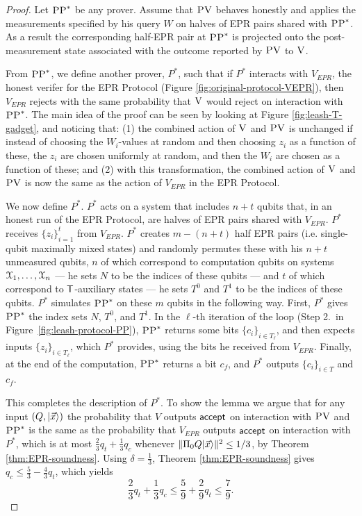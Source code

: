\begin{proof}
Let $\textsc{PP}^*$ be any prover. Assume that $\textsc{PV}$ behaves honestly and applies the measurements specified by his query $W$ on halves of EPR pairs shared with $\textsc{PP}^*$. As a result the corresponding half-EPR pair at $\textsc{PP}^*$ is projected onto the post-measurement state associated with the outcome reported by $\textsc{PV}$ to $\textsc{V}$. 


From $\textsc{PP}^*$, we define another prover, $P^*$, such that if $P^*$ interacts with $V_{EPR}$,  the honest verifer for the EPR Protocol (Figure \ref{fig:original-protocol-VEPR}), then $V_{EPR}$ rejects with the same probability that $\textsc{V}$ would reject on interaction with $\textsc{PP}^*$. The main idea of the proof can be seen by looking at Figure \ref{fig:leash-T-gadget}, and noticing that: (1) the combined action of $\textsc{V}$ and $\textsc{PV}$ is unchanged if instead of choosing the $W_i$-values at random and then choosing $z_i$ as a function of these, the $z_i$ are chosen uniformly at random, and then the $W_i$ are chosen as a function of these; and (2) with this transformation, the combined action of $\textsc{V}$ and $\textsc{PV}$ is now the same as the action of $V_{EPR}$ in the EPR Protocol. 

We now define $P^*$. $P^*$ acts on a system that includes $n+t$ qubits that, in an honest run of the EPR Protocol, are halves of EPR pairs shared with $V_{EPR}$. $P^*$ receives $\{{z}_i\}_{i=1}^t$ from $V_{EPR}$. $P^*$ creates $m-(n+t)$ half EPR pairs (i.e. single-qubit maximally mixed states) and randomly permutes these with his $n+t$ unmeasured qubits, $n$ of which correspond to computation qubits on systems ${\cal X}_1,\dots,{\cal X}_n$ --- he sets $N$ to be the indices of these qubits --- and $t$ of which correspond to $\sf T$-auxiliary states --- he sets $T^0$ and $T^1$ to be the indices of these qubits. $P^*$ simulates $\textsc{PP}^*$ on these $m$ qubits in the following way. First, $P^*$ gives $\textsc{PP}^*$ the index sets $N$, $T^0$, and $T^1$. In the $\ell$-th iteration of the loop (Step 2.\ in Figure~\ref{fig:leash-protocol-PP}), $\textsc{PP}^*$ returns some bits $\{c_i\}_{i\in T_\ell}$, and then expects inputs $\{z_i\}_{i\in T_\ell}$, which $P^*$ provides, using the bits he received from $V_{EPR}$. Finally, at the end of the computation, $\textsc{PP}^*$ returns a bit $c_f$, and $P^*$ outputs $\{c_i\}_{i\in T}$ and ${c_f}$. 

This completes the description of $P^*$. To show the lemma we argue that for any input $(Q,|\vec{x}\rangle)$ the probability that $V$ outputs $\sf accept$ on interaction with $\textsc{PV}$ and $\textsc{PP}^*$ is the same as the probability that $V_{EPR}$ outputs $\sf accept$ on interaction with $P^*$, which is at most $\frac{2}{3}q_t+\frac{1}{3}q_c$ whenever $\|\Pi_0 Q |\vec{x}\rangle\|^2 \leq 1/3$, by Theorem \ref{thm:EPR-soundness}. Using $\delta=\frac{1}{3}$, Theorem \ref{thm:EPR-soundness} gives $q_c\leq \frac{5}{3}-\frac{4}{3}q_t$, which yields
$$\frac{2}{3}q_t+\frac{1}{3}q_c\leq \frac{5}{9}+\frac{2}{9}q_t\leq \frac{7}{9}.$$



\end{proof}
